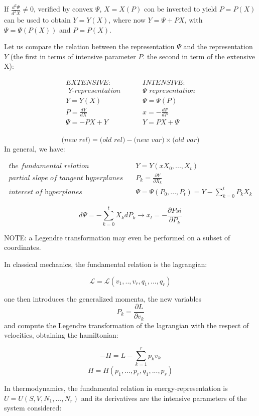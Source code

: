 \documentclass{article}
\begin{document}
If $\frac{d^2 \Psi}{d^2 X} \neq 0$, verified by convex $\Psi$, $X=X(P)$ con be inverted to yield $P=P(X)$ can be used to obtain $Y=Y(X)$, where now $Y = \Psi + PX$, with $\Psi = \Psi(P(X))$ and $P=P(X)$.

Let us compare the relation between the representation $\Psi$ and the representation $Y$ (the first in terms of intensive parameter $P$. the second in term of the extensive X):

\begin{align*}
\textit{EXTENSIVE:} \quad \quad & \textit{INTENSIVE:} \\
\textit{ Y-representation } \quad \quad & \textit{$\Psi$ representation} \\
Y = Y(X) \quad  \quad& \Psi = \Psi(P) \\
P = \frac{d Y}{d X} \quad \quad & x = - \frac{d \Psi}{d P} \\
\Psi = -PX + Y \quad \quad & Y = PX + \Psi \\
\end{align*}

$$ \textit{(new rel)} = \textit{(old rel)} -  \textit{(new var)} \times \textit{(old var)}$$
In general, we have:

\begin{align*}
\textit{the fundamental relation} \quad & Y=Y(xX_0,...,X_t) \\
\textit{partial slope of tangent hyperplanes} \quad & P_k = \frac{\partial Y}{\partial X_k} \\
\textit{intercet of hyperplanes } \quad & \Psi = \Psi(P_0,...,P_t) = Y -\sum_{k=0}^{t} P_k X_k
\end{align*}

$$d \Psi = - \sum_{k=0}^{t} X_k dP_k \rightarrow x_l = -\frac{\partial Psi}{\partial P_k}$$

NOTE: a Legendre transformation may even be performed on a subset of coordinates.

In classical mechanics, the fundamental relation is the lagrangian:

$$\mathcal{L} = \mathcal{L}(v_1,..,v_r,q_1,...,q_r)$$

one then introduces the generalized momenta, the new variables $$P_k = \frac{\partial L}{ \partial v_k}$$ and compute the Legendre transformation of the lagrangian with the respect of velocities, obtaining the hamiltonian:

$$ -H = L - \sum_{k=1}^{r} p_k v_k$$
$$ H = H(p_1,...,p_r,q_1,...,p_r)$$

In thermodynamics, the fundamental relation in energy-representation is $U=U(S,V,N_1,...,N_r)$ and its derivatives are the intensive parameters of the system considered:
\end{document}
